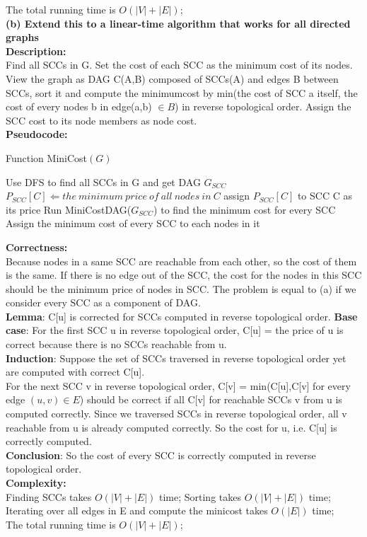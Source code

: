 \documentclass{article}
\begin{document}
The total running time is $O(|V|+|E|)$;\\
\textbf{(b) Extend this to a linear-time algorithm that works for all directed graphs}\\
\textbf{\large Description:\\}
Find all SCCs in G. Set the cost of each SCC as the minimum cost of its nodes. View the graph as DAG C(A,B) composed of SCCs(A) and edges B between SCCs, sort it and compute the minimumcost by min(the cost of SCC a itself, the cost of every nodes b in edge(a,b) $\in B$) in reverse topological order. Assign the SCC cost to its node members as node cost.\\
\textbf{\large Pseudocode:\\}
\begin{algorithm}[H]
  \caption{Function MiniCost$(G)$}
  \label{alg1}
  \begin{algorithmic}
  \STATE Use DFS to find all SCCs in G and get DAG $G_{SCC}$
  \STATE $P_{SCC}[C] \Longleftarrow the\ minimum\ price\ of\ all\ nodes\ in\ C$
  \STATE assign $P_{SCC}[C]$ to SCC C as its price
  \ENDFOR
  \STATE Run MiniCostDAG($G_{SCC}$) to find the minimum cost for every SCC
  \STATE Assign the minimum cost of every SCC to each nodes in it
  \end{algorithmic}
\end{algorithm}
\noindent\textbf{\large Correctness:\\}
Because nodes in a same SCC are reachable from each other, so the cost of them is the same. If there is no edge out of the SCC, the cost for the nodes in this SCC should be the minimum price of nodes in SCC. The problem is equal to (a) if we consider every SCC as a component of DAG.\\
\textbf{Lemma}: C[u] is corrected for SCCs computed in reverse topological order.
\textbf{Base case}: For the first SCC u in reverse topological order, C[u] = the price of u is correct because there is no SCCs reachable from u.\\
\textbf{Induction}: Suppose the set of SCCs traversed in reverse topological order yet are computed with correct C[u].\\
For the next SCC v in reverse topological order, C[v] = min(C[u],C[v] for every edge $(u,v)\in E$) should be correct if all C[v] for reachable SCCs v from u is computed correctly. Since we traversed SCCs in reverse topological order, all v reachable from u is already computed correctly. So the cost for u, i.e. C[u] is correctly computed.\\
\textbf{Conclusion}:
So the cost of every SCC is correctly computed in reverse topological order.\\
\textbf{\large Complexity:\\}
Finding SCCs takes $O(|V|+|E|)$ time; Sorting takes $O(|V|+|E|)$ time; Iterating over all edges in E and compute the minicost takes $O(|E|)$ time;\\
The total running time is $O(|V|+|E|)$;\\
\end{document}
